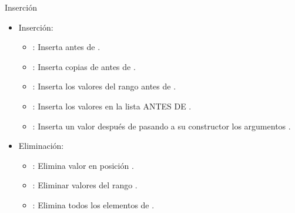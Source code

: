 \begin{frame}[t,fragile]{Inserción}
\begin{itemize}
  \item Inserción:
    \begin{itemize}
      \item {}: Inserta  antes de .
      \item {}: Inserta  copias de  antes de .
      \item {}: Inserta los valores del rango \cppid{[i,j)} antes de .
      \item {}: Inserta los valores en la lista  ANTES DE .
      \item {}: Inserta un valor después de  pasando a su constructor los argumentos . 
    \end{itemize}
  \item Eliminación:
    \begin{itemize}
      \item {}: Elimina valor en posición .
      \item {}: Eliminar valores del rango \cppid{[i,j)}.
      \item {}: Elimina todos los elementos de .
    \end{itemize}
\end{itemize}
\end{frame}
